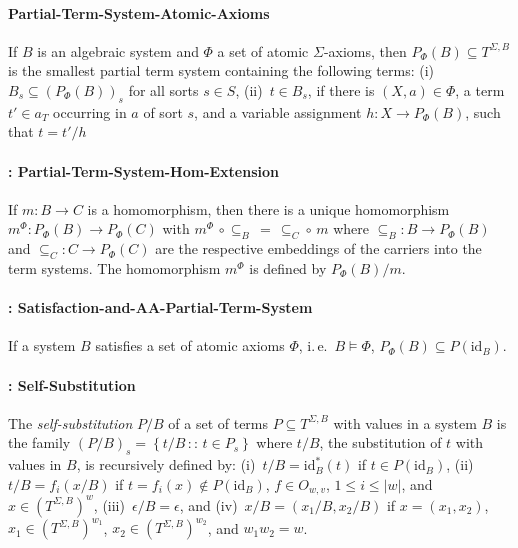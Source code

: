 \paragraph{ Partial-Term-System-Atomic-Axioms} If $B$ is an algebraic system and $\Phi$ a set of
atomic $\Sigma$-axioms, then $P_{\Phi}(B)\subseteq T^{\Sigma,B}$
is the smallest partial term system containing the following terms:
(i)~$B_{s}\subseteq\left(P_{\Phi}(B)\right)_{s}$ for all sorts $s\in S$,
(ii)~$t\in B_{s}$, if there is $\left(X,a\right)\in\Phi$, a term
$t'\in a_{T}$ occurring in $a$ of sort $s$, and a variable assignment
$h:X\rightarrow P_{\Phi}(B)$, such that $t=t'/h$%


\paragraph{: Partial-Term-System-Hom-Extension}If $m:B\rightarrow C$
is a homomorphism, then there is a unique homomorphism $m^{\Phi}:P_{\Phi}(B)\rightarrow P_{\Phi}(C)$
with $m^{\Phi}\,\circ\subseteq_{B}\,=\,\subseteq_{C}\!\circ\, m$
where $\subseteq_{B}:B\rightarrow P_{\Phi}(B)$ and $\subseteq_{C}:C\rightarrow P_{\Phi}(C)$
are the respective embeddings of the carriers into the term systems.
The homomorphism $m^{\Phi}$ is defined by $P_{\Phi}(B)/m$.

\paragraph{: Satisfaction-and-AA-Partial-Term-System}If a system $B$
satisfies a set of atomic axioms $\Phi$, i.\,e.~$B\models\Phi$,
$P_{\Phi}(B)\subseteq P(\textrm{id}_{B})$.



\paragraph{: Self-Substitution} The \emph{self-substitution}
$P/B$ of a set of terms $P\subseteq T^{\Sigma,B}$ with values in
a system $B$ is the family $\left(P/B\right)_{s}=\left\{ t/B\,::\, t\in P_{s}\right\} $
where $t/B$, the substitution of $t$ with values in $B$, is recursively
defined by: (i)~$t/B=\textrm{id}_{B}^{*}(t)$ if $t\in P(\textrm{id}_{B})$,
(ii)~$t/B=f_{i}(x/B)$ if $t=f_{i}(x)\notin P(\textrm{id}_{B})$,
$f\in O_{w,v}$, $1\leq i\leq|w|$, and $x\in\left(T^{\Sigma,B}\right)^{w}$,
(iii)~$\epsilon/B=\epsilon$, and (iv)~$x/B=\left(x_{1}/B,x_{2}/B\right)$
if $x=\left(x_{1},x_{2}\right)$, $x_{1}\in\left(T^{\Sigma,B}\right)^{w_{1}}$,
$x_{2}\in\left(T^{\Sigma,B}\right)^{w_{2}}$, and $w_{1}w_{2}=w$.




